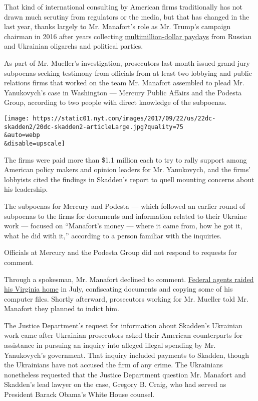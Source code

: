 That kind of international consulting by American firms traditionally
has not drawn much scrutiny from regulators or the media, but that has
changed in the last year, thanks largely to Mr. Manafort's role as Mr.
Trump's campaign chairman in 2016 after years collecting
\href{https://www.nytimes.com/2017/06/27/us/politics/trump-campaign-chiefs-firm-got-17-million-from-pro-russia-party.html?mcubz=3}{multimillion-dollar
paydays} from Russian and Ukrainian oligarchs and political parties.

As part of Mr. Mueller's investigation, prosecutors last month issued
grand jury subpoenas seeking testimony from officials from at least two
lobbying and public relations firms that worked on the team Mr. Manafort
assembled to plead Mr. Yanukovych's case in Washington --- Mercury
Public Affairs and the Podesta Group, according to two people with
direct knowledge of the subpoenas.

\texttt{[image: https://static01.nyt.com/images/2017/09/22/us/22dc-skadden2/20dc-skadden2-articleLarge.jpg?quality=75\\\&auto=webp\\\&disable=upscale]}

The firms were paid more than \$1.1 million each to try to rally support
among American policy makers and opinion leaders for Mr. Yanukovych, and
the firms' lobbyists cited the findings in Skadden's report to quell
mounting concerns about his leadership.

The subpoenas for Mercury and Podesta --- which followed an earlier
round of subpoenas to the firms for documents and information related to
their Ukraine work --- focused on ``Manafort's money --- where it came
from, how he got it, what he did with it,'' according to a person
familiar with the inquiries.

Officials at Mercury and the Podesta Group did not respond to requests
for comment.

Through a spokesman, Mr. Manafort declined to comment.
\href{https://www.nytimes.com/2017/08/09/us/politics/paul-manafort-home-search-mueller.html}{Federal
agents raided his Virginia home} in July, confiscating documents and
copying some of his computer files. Shortly afterward, prosecutors
working for Mr. Mueller told Mr. Manafort they planned to indict him.

The Justice Department's request for information about Skadden's
Ukrainian work came after Ukrainian prosecutors asked their American
counterparts for assistance in pursuing an inquiry into alleged illegal
spending by Mr. Yanukovych's government. That inquiry included payments
to Skadden, though the Ukrainians have not accused the firm of any
crime. The Ukrainians nonetheless requested that the Justice Department
question Mr. Manafort and Skadden's lead lawyer on the case, Gregory B.
Craig, who had served as President Barack Obama's White House counsel.

